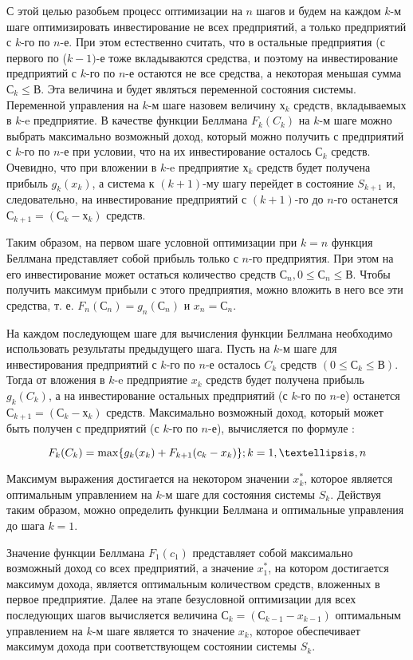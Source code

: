 С этой целью разобьем процесс оптимизации на $n$ шагов и будем на каждом $k$-м шаге оптимизировать инвестирование не всех предприятий, а только предприятий с $k$-го по $n$-е. При этом естественно считать, что в остальные предприятия (с первого по ($k-1)$-е тоже вкладываются средства, и поэтому на инвестирование предприятий с $k$-го по $n$-е остаются не все средства, а некоторая меньшая сумма $С_k \leq В$. Эта величина и будет являться переменной состояния системы. Переменной управления на $k$-м шаге назовем величину $х_k$ средств, вкладываемых в $k$-e предприятие. В качестве функции Беллмана $F_k(C_k)$ на $k$-м шаге можно выбрать максимально возможный доход, который можно получить с предприятий с $k$-го по $n$-е при условии, что на их инвестирование осталось $С_k$ средств. Очевидно, что при вложении в $k$-e предприятие $х_k$ средств будет получена прибыль $g_k(x_k)$, а система к $(k+1)$-му шагу перейдет в состояние $S_{k+1}$ и, следовательно, на инвестирование предприятий с $(k+1)$-го до $n$-го останется $С_{k+1} = (С_k - х_k)$ средств.

Таким образом, на первом шаге условной оптимизации при $k = n$ функция Беллмана представляет собой прибыль только с $n$-го предприятия. При этом на его инвестирование может остаться количество средств $С_n, 0 \leq С_n \leq В$. Чтобы получить максимум прибыли с этого предприятия, можно вложить в него все эти средства, т. е. $F_n(С_n) = g_n(С_n)$ и $x_n = С_n$.

На каждом последующем шаге для вычисления функции Беллмана необходимо использовать результаты предыдущего шага. Пусть на $k$-м шаге для инвестирования предприятий с $k$-го по $n$-е осталось $C_k$ средств $(0 \leq С_k \leq В)$. Тогда от вложения в $k$-e предприятие $x_k$ средств будет получена прибыль $g_k(C_k)$, а на инвестирование остальных предприятий (с $k$-го по $n$-е) останется $С_{k+1} = (С_k - х_k)$ средств. Максимально возможный доход, который может быть получен с предприятий (с $k$-го по $n$-е), вычисляется по формуле \cite{formula:max:possible:income}:

\begin{equation}
\label{formula:max:possible:income}
F_k(C_k) = \max \{g_k(x_k) + F_{k+1}(c_k-x_k)\}; k = 1,\textellipsis,n
\end{equation}

Максимум выражения достигается на некотором значении $x^*_k$, которое является оптимальным управлением на $k$-м шаге для состояния системы $S_k$. Действуя таким образом, можно определить функции Беллмана и оптимальные управления до шага $k = 1$.

Значение функции Беллмана $F_1(c_1)$ представляет собой максимально возможный доход со всех предприятий, а значение $x^*_1$, на котором достигается максимум дохода, является оптимальным количеством средств, вложенных в первое предприятие. Далее на этапе безусловной оптимизации для всех последующих шагов вычисляется величина $С_k = (С_{k-1} - x_{k-1})$ оптимальным управлением на $k$-м шаге является то значение $x_k$, которое обеспечивает максимум дохода при соответствующем состоянии системы $S_k$.